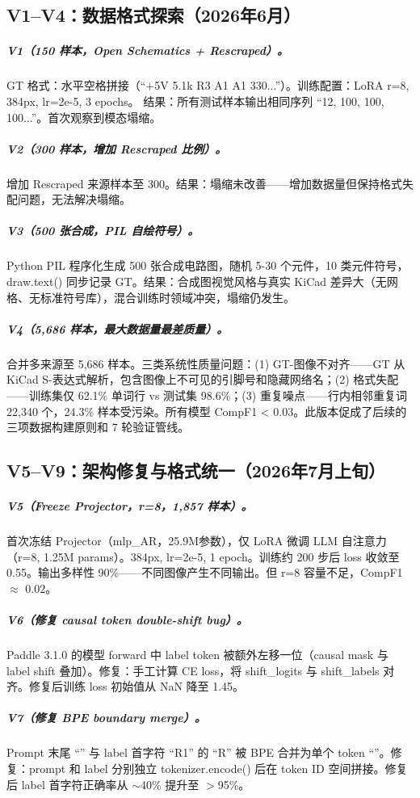 \subsection{V1--V4：数据格式探索（2026年6月）}

\subparagraph{V1（150 样本，Open Schematics + Rescraped）。}
GT 格式：水平空格拼接（``+5V 5.1k R3 A1 A1 330...''）。训练配置：LoRA r=8, 384px, lr=2e-5, 3 epochs。
结果：所有测试样本输出相同序列 ``12, 100, 100, 100...''。首次观察到模态塌缩。

\subparagraph{V2（300 样本，增加 Rescraped 比例）。}
增加 Rescraped 来源样本至 300。结果：塌缩未改善——增加数据量但保持格式失配问题，无法解决塌缩。

\subparagraph{V3（500 张合成，PIL 自绘符号）。}
Python PIL 程序化生成 500 张合成电路图，随机 5-30 个元件，10 类元件符号，draw.text() 同步记录 GT。结果：合成图视觉风格与真实 KiCad 差异大（无网格、无标准符号库），混合训练时领域冲突，塌缩仍发生。

\subparagraph{V4（5,686 样本，最大数据量最差质量）。}
合并多来源至 5,686 样本。三类系统性质量问题：(1) GT-图像不对齐——GT 从 KiCad S-表达式解析，包含图像上不可见的引脚号和隐藏网络名；(2) 格式失配——训练集仅 62.1\% 单词行 vs 测试集 98.6\%；(3) 重复噪点——行内相邻重复词 22,340 个，24.3\% 样本受污染。所有模型 CompF1 < 0.03。此版本促成了后续的三项数据构建原则和 7 轮验证管线。

\subsection{V5--V9：架构修复与格式统一（2026年7月上旬）}

\subparagraph{V5（Freeze Projector，r=8，1,857 样本）。}
首次冻结 Projector（mlp\_AR，25.9M参数），仅 LoRA 微调 LLM 自注意力（r=8, 1.25M params）。384px, lr=2e-5, 1 epoch。训练约 200 步后 loss 收敛至 0.55。输出多样性 90\%——不同图像产生不同输出。但 r=8 容量不足，CompF1 $\approx$ 0.02。

\subparagraph{V6（修复 causal token double-shift bug）。}
Paddle 3.1.0 的模型 forward 中 label token 被额外左移一位（causal mask 与 label shift 叠加）。修复：手工计算 CE loss，将 shift\_logits 与 shift\_labels 对齐。修复后训练 loss 初始值从 NaN 降至 1.45。

\subparagraph{V7（修复 BPE boundary merge）。}
Prompt 末尾 ``\n'' 与 label 首字符 ``R1'' 的 ``R'' 被 BPE 合并为单个 token ``\nR''。修复：prompt 和 label 分别独立 tokenizer.encode() 后在 token ID 空间拼接。修复后 label 首字符正确率从 $\sim$40\% 提升至 $>$95\%。

